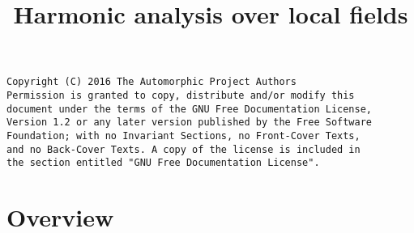 

%


\title{Harmonic analysis over local fields}


\maketitle

\label{section-phantom}

\begin{verbatim}
Copyright (C) 2016 The Automorphic Project Authors
Permission is granted to copy, distribute and/or modify this
document under the terms of the GNU Free Documentation License,
Version 1.2 or any later version published by the Free Software
Foundation; with no Invariant Sections, no Front-Cover Texts,
and no Back-Cover Texts. A copy of the license is included in
the section entitled "GNU Free Documentation License".
\end{verbatim}

\tableofcontents


\section{Overview}
\label{section-overview}








